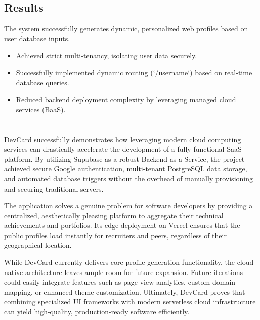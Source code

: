 \documentclass[12pt,a4paper]{report}     %
\begin{document}
\vspace{0.3cm}

\section{Results}

The system successfully generates dynamic, personalized web profiles based on user database inputs.

\begin{itemize}
    \item Achieved strict multi-tenancy, isolating user data securely.
    \item Successfully implemented dynamic routing (`/username`) based on real-time database queries.
    \item Reduced backend deployment complexity by leveraging managed cloud services (BaaS).
\end{itemize}

\newpage 
\chapter{}
\begin{normalsize}
\setlength{\baselineskip}{1.3\baselineskip}

DevCard successfully demonstrates how leveraging modern cloud computing services can drastically accelerate the development of a fully functional SaaS platform. By utilizing Supabase as a robust Backend-as-a-Service, the project achieved secure Google authentication, multi-tenant PostgreSQL data storage, and automated database triggers without the overhead of manually provisioning and securing traditional servers.

The application solves a genuine problem for software developers by providing a centralized, aesthetically pleasing platform to aggregate their technical achievements and portfolios. Its edge deployment on Vercel ensures that the public profiles load instantly for recruiters and peers, regardless of their geographical location.

While DevCard currently delivers core profile generation functionality, the cloud-native architecture leaves ample room for future expansion. Future iterations could easily integrate features such as page-view analytics, custom domain mapping, or enhanced theme customization. Ultimately, DevCard proves that combining specialized UI frameworks with modern serverless cloud infrastructure can yield high-quality, production-ready software efficiently.


\end{normalsize}
\end{document}
